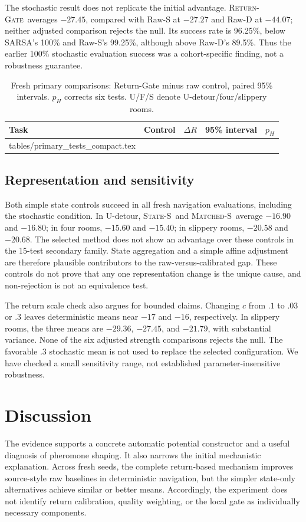 \documentclass[10pt,twocolumn,letterpaper]{article}
\makeatletter
\newcommand{\gate}{\textsc{Return-Gate}}
\newcommand{\states}{\textsc{State-S}}
\newcommand{\matched}{\textsc{Matched-S}}
\newcommand{\tableinput}[1]{\@@input #1 }
\makeatother
\begin{document}
The stochastic result does not replicate the initial advantage. \gate\ averages $-27.45$, compared with Raw-S at $-27.27$ and Raw-D at $-44.07$; neither adjusted comparison rejects the null. Its success rate is 96.25\%, below SARSA's 100\% and Raw-S's 99.25\%, although above Raw-D's 89.5\%. Thus the earlier 100\% stochastic evaluation success was a cohort-specific finding, not a robustness guarantee.

\begin{table}[tb]
 \centering\small
 \setlength{\tabcolsep}{2.5pt}
 \caption{Fresh primary comparisons: Return-Gate minus raw control, paired 95\% intervals. $p_H$ corrects six tests. U/F/S denote U-detour/four/slippery rooms.}
 \label{tab:tests}
 \begin{tabular}{@{}llrrr@{}}\toprule
 Task & Control & $\Delta R$ & 95\% interval & $p_H$\\\midrule
 \tableinput{tables/primary_tests_compact.tex}
 \bottomrule\end{tabular}
\end{table}

\subsection{Representation and sensitivity}
Both simple state controls succeed in all fresh navigation evaluations, including the stochastic condition. In U-detour, \states\ and \matched\ average $-16.90$ and $-16.80$; in four rooms, $-15.60$ and $-15.40$; in slippery rooms, $-20.58$ and $-20.68$. The selected method does not show an advantage over these controls in the 15-test secondary family. State aggregation and a simple affine adjustment are therefore plausible contributors to the raw-versus-calibrated gap. These controls do not prove that any one representation change is the unique cause, and non-rejection is not an equivalence test.

The return scale check also argues for bounded claims. Changing $c$ from $.1$ to $.03$ or $.3$ leaves deterministic means near $-17$ and $-16$, respectively. In slippery rooms, the three means are $-29.36$, $-27.45$, and $-21.79$, with substantial variance. None of the six adjusted strength comparisons rejects the null. The favorable $.3$ stochastic mean is not used to replace the selected configuration. We have checked a small sensitivity range, not established parameter-insensitive robustness.

\section{Discussion}
The evidence supports a concrete automatic potential constructor and a useful diagnosis of pheromone shaping. It also narrows the initial mechanistic explanation. Across fresh seeds, the complete return-based mechanism improves source-style raw baselines in deterministic navigation, but the simpler state-only alternatives achieve similar or better means. Accordingly, the experiment does not identify return calibration, quality weighting, or the local gate as individually necessary components.
\end{document}

